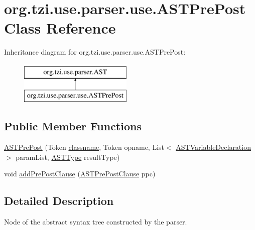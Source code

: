 \hypertarget{classorg_1_1tzi_1_1use_1_1parser_1_1use_1_1_a_s_t_pre_post}{\section{org.\-tzi.\-use.\-parser.\-use.\-A\-S\-T\-Pre\-Post Class Reference}
\label{classorg_1_1tzi_1_1use_1_1parser_1_1use_1_1_a_s_t_pre_post}
}
Inheritance diagram for org.\-tzi.\-use.\-parser.\-use.\-A\-S\-T\-Pre\-Post\-:\begin{figure}[H]
\begin{center}
\leavevmode
\includegraphics[height=2.000000cm]{classorg_1_1tzi_1_1use_1_1parser_1_1use_1_1_a_s_t_pre_post}
\end{center}
\end{figure}
\subsection*{Public Member Functions}
\begin{DoxyCompactItemize}
\item 
\hyperlink{classorg_1_1tzi_1_1use_1_1parser_1_1use_1_1_a_s_t_pre_post_a90a7e1a38b4472a2e66e3776ee7b3c01}{A\-S\-T\-Pre\-Post} (Token \hyperlink{classorg_1_1tzi_1_1use_1_1parser_1_1_a_s_t_ad833d12ce42bce93cf471418d1bd22e2}{classname}, Token opname, List$<$ \hyperlink{classorg_1_1tzi_1_1use_1_1parser_1_1ocl_1_1_a_s_t_variable_declaration}{A\-S\-T\-Variable\-Declaration} $>$ param\-List, \hyperlink{classorg_1_1tzi_1_1use_1_1parser_1_1ocl_1_1_a_s_t_type}{A\-S\-T\-Type} result\-Type)
\item 
void \hyperlink{classorg_1_1tzi_1_1use_1_1parser_1_1use_1_1_a_s_t_pre_post_aba4d223947e8dae532efa6bf99314b9e}{add\-Pre\-Post\-Clause} (\hyperlink{classorg_1_1tzi_1_1use_1_1parser_1_1use_1_1_a_s_t_pre_post_clause}{A\-S\-T\-Pre\-Post\-Clause} ppc)
\end{DoxyCompactItemize}


\subsection{Detailed Description}
Node of the abstract syntax tree constructed by the parser.

